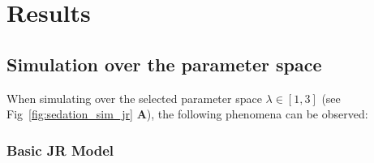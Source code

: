 \chapter{Results}\label{ch:results}






%

%
%
%
%
%


\section{Simulation over the parameter space}\label{sec:simulation-over-the-parameter-space}

When simulating over the selected parameter space $ \lambda \in \left[ 1, 3 \right] $ (see Fig~\ref{fig:sedation_sim_jr}
\textbf{A}),
the following phenomena can be observed:



\newtoggle{drawLocRoc}

\subsection{Basic JR Model}


